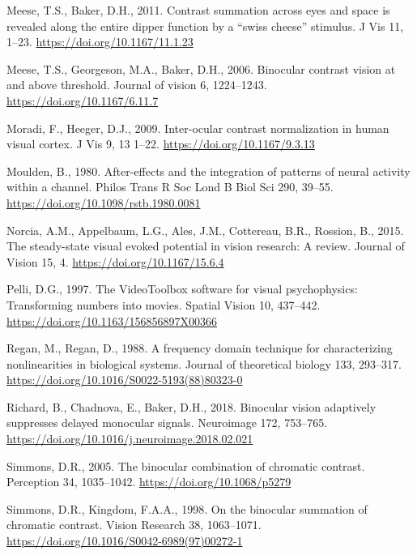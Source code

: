 \documentclass[review,
  12pt,
]{elsarticle}
\newlength{\cslhangindent}
\newenvironment{CSLReferences}[2] %
 {\begin{list}{}{%
  \setlength{\itemindent}{0pt}
  \setlength{\leftmargin}{0pt}
  \setlength{\parsep}{0pt}
  \ifodd #1
   \setlength{\leftmargin}{\cslhangindent}
   \setlength{\itemindent}{-1\cslhangindent}
  \fi
  \setlength{\itemsep}{#2\baselineskip}}}
 {\end{list}}
\begin{document}
\begin{CSLReferences}{1}{0}
Meese, T.S., Baker, D.H., 2011. Contrast summation across eyes and space
is revealed along the entire dipper function by a {``swiss cheese''}
stimulus. J Vis 11, 1--23. \url{https://doi.org/10.1167/11.1.23}

Meese, T.S., Georgeson, M.A., Baker, D.H., 2006. Binocular contrast
vision at and above threshold. Journal of vision 6, 1224--1243.
\url{https://doi.org/10.1167/6.11.7}

Moradi, F., Heeger, D.J., 2009. Inter-ocular contrast normalization in
human visual cortex. J Vis 9, 13 1--22.
\url{https://doi.org/10.1167/9.3.13}

Moulden, B., 1980. After-effects and the integration of patterns of
neural activity within a channel. Philos Trans R Soc Lond B Biol Sci
290, 39--55. \url{https://doi.org/10.1098/rstb.1980.0081}

Norcia, A.M., Appelbaum, L.G., Ales, J.M., Cottereau, B.R., Rossion, B.,
2015. The steady-state visual evoked potential in vision research: A
review. Journal of Vision 15, 4. \url{https://doi.org/10.1167/15.6.4}

Pelli, D.G., 1997. The VideoToolbox software for visual psychophysics:
Transforming numbers into movies. Spatial Vision 10, 437--442.
\url{https://doi.org/10.1163/156856897X00366}

Regan, M., Regan, D., 1988. A frequency domain technique for
characterizing nonlinearities in biological systems. Journal of
theoretical biology 133, 293--317.
\url{https://doi.org/10.1016/S0022-5193(88)80323-0}

Richard, B., Chadnova, E., Baker, D.H., 2018. Binocular vision
adaptively suppresses delayed monocular signals. Neuroimage 172,
753--765. \url{https://doi.org/10.1016/j.neuroimage.2018.02.021}

Simmons, D.R., 2005. The binocular combination of chromatic contrast.
Perception 34, 1035--1042. \url{https://doi.org/10.1068/p5279}

Simmons, D.R., Kingdom, F.A.A., 1998. On the binocular summation of
chromatic contrast. Vision Research 38, 1063--1071.
\url{https://doi.org/10.1016/S0042-6989(97)00272-1}


\end{CSLReferences}
\end{document}

